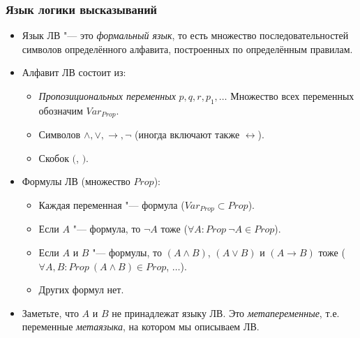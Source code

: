 \documentclass[10pt]{beamer}
\begin{document}
\begin{frame}
    \frametitle{Язык логики высказываний}
    \begin{itemize}
        \item Язык ЛВ "--- это \emph{формальный язык}, то есть множество последовательностей символов определённого алфавита, построенных по определённым правилам.
        \pause
        \item Алфавит ЛВ состоит из:
        \begin{itemize}
            \item \emph{Пропозициональных переменных} $p, q, r, p_1,\ldots$ Множество всех переменных обозначим $Var_{Prop}$.
            \item Символов $\land, \lor, \to, \neg$ (иногда включают также $\leftrightarrow$).
            \item Скобок $($, $)$. 
        \end{itemize}
        \pause
        \item Формулы ЛВ (множество $Prop$):
        \begin{itemize}
            \item Каждая переменная "--- формула ($Var_{Prop} \subset Prop$).
            \item Если $A$ "--- формула, то $\neg A$ тоже ($\forall A : Prop ~ \neg A \in Prop$).
            \item Если $A$ и $B$ "--- формулы, то $(A \land B)$, $(A \lor B)$ и $(A \to B)$ тоже ($\forall A, B : Prop ~ (A \land B) \in Prop$, $\ldots$).
            \item Других формул нет.
        \end{itemize}
        \pause
        \item Заметьте, что $A$ и $B$ не принадлежат языку ЛВ. Это \emph{метапеременные}, т.е. переменные \emph{метаязыка}, на котором мы описываем ЛВ. 
    \end{itemize}
\end{frame}
\end{document}
